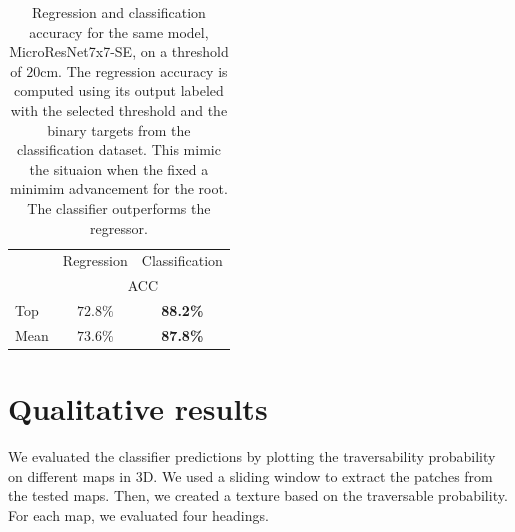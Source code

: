 \documentclass[../document.tex]{subfiles}
\begin{document}
\begin{table}[htbp]
  \centering
  \begin{tabular}{@{}lcc@{}}
  \toprule
  &  Regression & Classification  \\
 & \multicolumn{2}{c}{ACC} \\ 
  \cline{2-3}
   Top & $72.8\%$ & \textbf{88.2\%} \\
   Mean & $73.6\%$ & \textbf{87.8\%} \\
  \bottomrule   
\end{tabular}
\caption{Regression and classification accuracy for the same model,  MicroResNet7x7-SE, on a threshold of $20$cm. The regression accuracy is computed using its output labeled with the selected threshold and the binary targets from the classification dataset. This mimic the situaion when the fixed a minimim advancement for the root. The classifier outperforms the regressor.}
\label{tab : reg-clas}
\end{table}
\section{Qualitative results}
We evaluated the classifier predictions by plotting the traversability probability on different maps in 3D. We used a sliding window to extract the patches from the tested maps. Then, we created a texture based on the traversable probability. For each map, we evaluated four headings.
\end{document}
